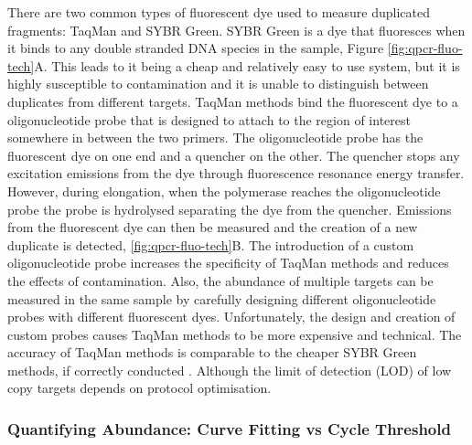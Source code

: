 \documentclass[../main.tex]{subfiles}
\begin{document}

There are two common types of fluorescent dye used to measure duplicated fragments: TaqMan and SYBR Green.
SYBR Green is a dye that fluoresces when it binds to any double stranded DNA species in the sample, Figure \ref{fig:qpcr-fluo-tech}A.
This leads to it being a cheap and relatively easy to use system, but it is highly susceptible to contamination and it is unable to distinguish between duplicates from different targets. 
TaqMan methods bind the fluorescent dye to a oligonucleotide probe that is designed to attach to the region of interest somewhere in between the two primers. 
The oligonucleotide probe has the fluorescent dye on one end and a quencher on the other.
The quencher stops any excitation emissions from the dye through fluorescence resonance energy transfer. 
However, during elongation, when the polymerase reaches the oligonucleotide probe the probe is hydrolysed separating the dye from the quencher.
Emissions from the fluorescent dye can then be measured and the creation of a new duplicate is detected, \ref{fig:qpcr-fluo-tech}B. 
The introduction of a custom oligonucleotide probe increases the specificity of TaqMan methods and reduces the effects of contamination. 
Also, the abundance of multiple targets can be measured in the same sample by carefully designing different oligonucleotide probes with different fluorescent dyes.
Unfortunately, the design and creation of custom probes causes TaqMan methods to be more expensive and technical. 
The accuracy of TaqMan methods is comparable to the cheaper SYBR Green methods, if correctly conducted \parencite{Tajadini2014}.
Although the limit of detection (LOD) of low copy targets depends on protocol optimisation. 

\subsubsection{Quantifying Abundance: Curve Fitting vs Cycle Threshold}
\end{document}
